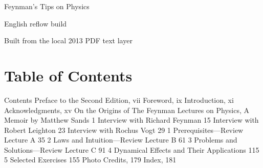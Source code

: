 \documentclass[10pt,oneside]{article}
\begin{document}
\begin{titlepage}
\centering
\vspace*{88bp}
{\fontsize{23}{27}\selectfont Feynman's Tips on Physics\par}
\vspace{16bp}
{\large English reflow build\par}
\vfill
{\small Built from the local 2013 PDF text layer\par}
\end{titlepage}
{}
\tableofcontents
\clearpage
{}
\section*{Table of Contents}
\label{tips-sec-0-table-of-contents}
Contents Preface to the Second Edition, vii Foreword, ix Introduction, xi Acknowledgments, xv On the Origins of The Feynman Lectures on Physics, A Memoir by Matthew Sands 1 Interview with Richard Feynman 15 Interview with Robert Leighton 23 Interview with Rochus Vogt 29 1 Prerequisites---Review Lecture A 35 2 Laws and Intuition---Review Lecture B 61 3 Problems and Solutions---Review Lecture C 91 4 Dynamical Effects and Their Applications 115 5 Selected Exercises 155 Photo Credits, 179 Index, 181\par

\clearpage
{}
\end{document}
